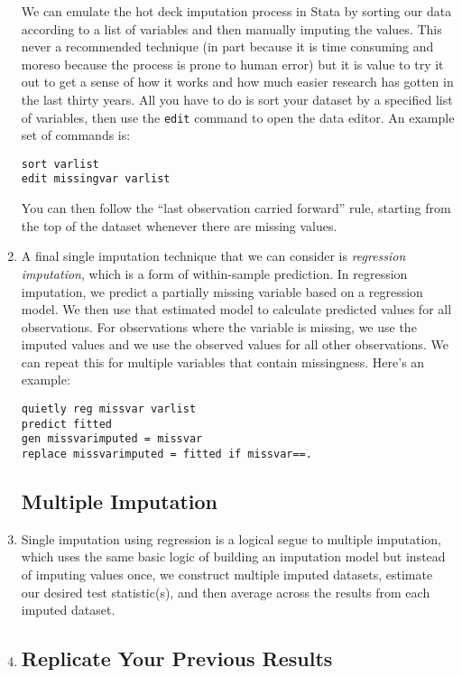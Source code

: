 \documentclass[a4paper,12pt]{article}
\begin{document}
\begin{enumerate}
We can emulate the hot deck imputation process in Stata by sorting our data according to a list of variables and then manually imputing the values. This never a recommended technique (in part because it is time consuming and moreso because the process is prone to human error) but it is value to try it out to get a sense of how it works and how much easier research has gotten in the last thirty years. All you have to do is sort your dataset by a specified list of variables, then use the \texttt{edit} command to open the data editor. An example set of commands is:
\begin{verbatim}
sort varlist
edit missingvar varlist
\end{verbatim}

You can then follow the ``last observation carried forward'' rule, starting from the top of the dataset whenever there are missing values. 

\item A final single imputation technique that we can consider is {\em regression imputation}, which is a form of within-sample prediction. In regression imputation, we predict a partially missing variable based on a regression model. We then use that estimated model to calculate predicted values for all observations. For observations where the variable is missing, we use the imputed values and we use the observed values for all other observations. We can repeat this for multiple variables that contain missingness. Here's an example:

\begin{verbatim}
quietly reg missvar varlist
predict fitted
gen missvarimputed = missvar
replace missvarimputed = fitted if missvar==.
\end{verbatim}

\subsection*{Multiple Imputation}

\item Single imputation using regression is a logical segue to multiple imputation, which uses the same basic logic of building an imputation model but instead of imputing values once, we construct multiple imputed datasets, estimate our desired test statistic(s), and then average across the results from each imputed dataset.

\item %


\subsection*{Replicate Your Previous Results}


\end{enumerate}
\end{document}

